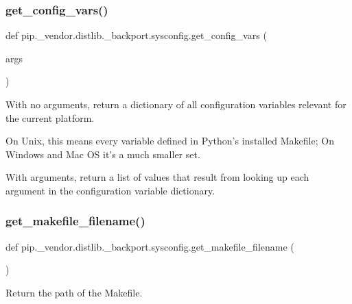 \subsubsection{\texorpdfstring{get\+\_\+config\+\_\+vars()}{get\_config\_vars()}}
{\footnotesize\ttfamily def pip.\+\_\+vendor.\+distlib.\+\_\+backport.\+sysconfig.\+get\+\_\+config\+\_\+vars (\begin{DoxyParamCaption}\item[{}]{args }\end{DoxyParamCaption})}

\begin{DoxyVerb}With no arguments, return a dictionary of all configuration
variables relevant for the current platform.

On Unix, this means every variable defined in Python's installed Makefile;
On Windows and Mac OS it's a much smaller set.

With arguments, return a list of values that result from looking up
each argument in the configuration variable dictionary.
\end{DoxyVerb}
 \mbox{\label{namespacepip_1_1__vendor_1_1distlib_1_1__backport_1_1sysconfig_a088aae485c0e31e3cd49080997281543}} 
\subsubsection{\texorpdfstring{get\+\_\+makefile\+\_\+filename()}{get\_makefile\_filename()}}
{\footnotesize\ttfamily def pip.\+\_\+vendor.\+distlib.\+\_\+backport.\+sysconfig.\+get\+\_\+makefile\+\_\+filename (\begin{DoxyParamCaption}{ }\end{DoxyParamCaption})}

\begin{DoxyVerb}Return the path of the Makefile.\end{DoxyVerb}
 \mbox{\label{namespacepip_1_1__vendor_1_1distlib_1_1__backport_1_1sysconfig_a59aa125eaa4f24e4333d8050492643cb}} 
